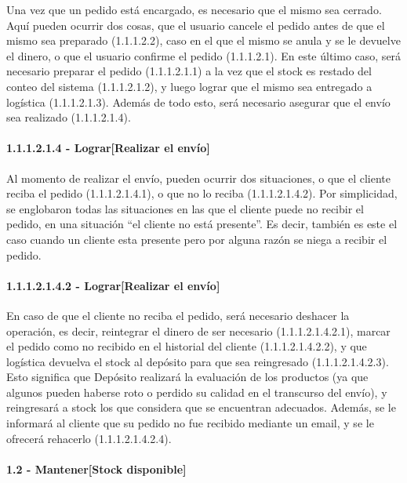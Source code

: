 Una vez que un pedido está encargado, es necesario que el mismo sea cerrado.
Aquí pueden ocurrir dos cosas, que el usuario cancele el pedido antes de que el
mismo sea preparado (1.1.1.2.2), caso en el que el mismo se anula y se le
devuelve el dinero, o que el usuario confirme el pedido (1.1.1.2.1). En este
último caso, será necesario preparar el pedido (1.1.1.2.1.1) a la vez que el
stock es restado del conteo del sistema (1.1.1.2.1.2), y luego lograr que el
mismo sea entregado a logística (1.1.1.2.1.3). Además de todo esto, será
necesario asegurar que el envío sea realizado (1.1.1.2.1.4).

\paragraph{1.1.1.2.1.4 - Lograr[Realizar el envío]} \label{para:1.1.1.2.1.4}

Al momento de realizar el envío, pueden ocurrir dos situaciones, o que el
cliente reciba el pedido (1.1.1.2.1.4.1), o que no lo reciba (1.1.1.2.1.4.2).
Por simplicidad, se englobaron todas las situaciones en las que el cliente puede
no recibir el pedido, en una situación ``el cliente no está presente''. Es
decir, también es este el caso cuando un cliente esta presente pero por alguna
razón se niega a recibir el pedido.

\paragraph{1.1.1.2.1.4.2 - Lograr[Realizar el envío]} \label{para:1.1.1.2.1.4.2}

En caso de que el cliente no reciba el pedido, será necesario deshacer la
operación, es decir, reintegrar el dinero de ser necesario (1.1.1.2.1.4.2.1),
marcar el pedido como no recibido en el historial del cliente (1.1.1.2.1.4.2.2),
y que logística devuelva el stock al depósito para que sea reingresado
(1.1.1.2.1.4.2.3). Esto significa que Depósito realizará la evaluación de los
productos (ya que algunos pueden haberse roto o perdido su calidad en el
transcurso del envío), y reingresará a stock los que considera que se encuentran
adecuados. Además, se le informará al cliente que su pedido no fue recibido
mediante un email, y se le ofrecerá rehacerlo (1.1.1.2.1.4.2.4).

\clearpage
\paragraph{1.2 - Mantener[Stock disponible]} \label{para:1.2}

